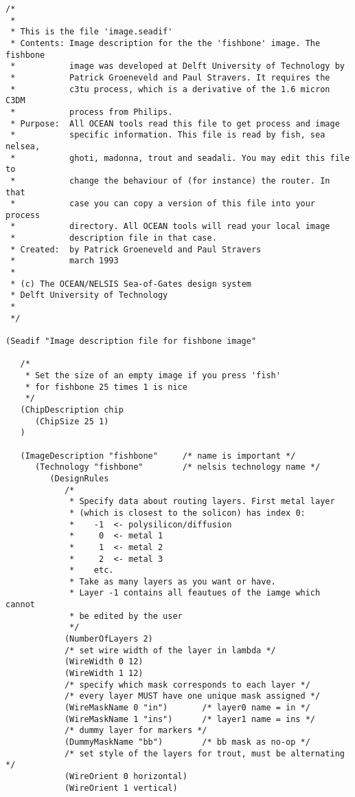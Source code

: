 {\small
\begin{verbatim}
/* 
 *
 * This is the file 'image.seadif'
 * Contents: Image description for the the 'fishbone' image. The fishbone
 *           image was developed at Delft University of Technology by
 *           Patrick Groeneveld and Paul Stravers. It requires the
 *           c3tu process, which is a derivative of the 1.6 micron C3DM
 *           process from Philips.
 * Purpose:  All OCEAN tools read this file to get process and image 
 *           specific information. This file is read by fish, sea nelsea, 
 *           ghoti, madonna, trout and seadali. You may edit this file to 
 *           change the behaviour of (for instance) the router. In that 
 *           case you can copy a version of this file into your process 
 *           directory. All OCEAN tools will read your local image 
 *           description file in that case.
 * Created:  by Patrick Groeneveld and Paul Stravers
 *           march 1993
 *
 * (c) The OCEAN/NELSIS Sea-of-Gates design system 
 * Delft University of Technology
 *
 */

(Seadif "Image description file for fishbone image"

   /*
    * Set the size of an empty image if you press 'fish'
    * for fishbone 25 times 1 is nice
    */
   (ChipDescription chip
      (ChipSize 25 1)
   )
 
   (ImageDescription "fishbone"     /* name is important */
      (Technology "fishbone"        /* nelsis technology name */
         (DesignRules
            /* 
             * Specify data about routing layers. First metal layer
             * (which is closest to the solicon) has index 0:
             *    -1  <- polysilicon/diffusion
             *     0  <- metal 1
             *     1  <- metal 2
             *     2  <- metal 3
             *    etc.
             * Take as many layers as you want or have.
             * Layer -1 contains all feautues of the iamge which cannot 
             * be edited by the user
             */
            (NumberOfLayers 2)
            /* set wire width of the layer in lambda */
            (WireWidth 0 12)
            (WireWidth 1 12)
            /* specify which mask corresponds to each layer */
            /* every layer MUST have one unique mask assigned */
            (WireMaskName 0 "in")       /* layer0 name = in */
            (WireMaskName 1 "ins")      /* layer1 name = ins */
            /* dummy layer for markers */
            (DummyMaskName "bb")        /* bb mask as no-op */
            /* set style of the layers for trout, must be alternating */
            (WireOrient 0 horizontal) 
            (WireOrient 1 vertical)


\end{verbatim}}
